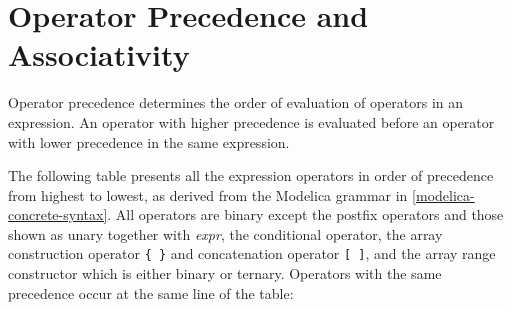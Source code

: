 \section{Operator Precedence and Associativity}\label{operator-precedence-and-associativity}

Operator precedence determines the order of evaluation of operators in
an expression. An operator with higher precedence is evaluated before an
operator with lower precedence in the same expression.

The following table presents all the expression operators in order of
precedence from highest to lowest, as derived from the Modelica grammar
in \cref{modelica-concrete-syntax}. All operators are binary except the postfix operators and
those shown as unary together with \emph{expr}, the conditional
operator, the array construction operator \lstinline!{ }! and concatenation
operator \lstinline![ ]!, and the array range constructor which is either binary
  or ternary. Operators with the same precedence occur at the same line of
the table:
